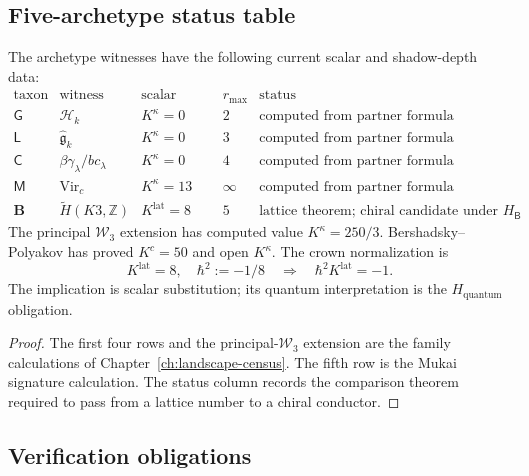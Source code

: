 \subsection{Five-archetype status table}
\label{ssec:climax-unified-five-archetypes}

\begin{proposition}
\label{prop:five-archetype-specialisation}
\ClaimStatusConditional
The archetype witnesses have the following current scalar and
shadow-depth data:
\[
\begin{array}{c|l|c|c|l}
\text{taxon}&\text{witness}&\text{scalar entry}&r_{\max}&\text{status}\\\hline
\mathsf G&\mathcal H_k&K^\kappa=0&2&\text{computed from partner formula}\\
\mathsf L&\widehat{\mathfrak g}_k&K^\kappa=0&3&\text{computed from partner formula}\\
\mathsf C&\beta\gamma_\lambda/bc_\lambda&K^\kappa=0&4&\text{computed from partner formula}\\
\mathsf M&\mathrm{Vir}_c&K^\kappa=13&\infty&\text{computed from partner formula}\\
\mathbf B&\widetilde H(K3,\mathbb Z)&K^{\mathrm{lat}}=8&5&
 \text{lattice theorem; chiral candidate under }H_{\mathsf B}
\end{array}
\]
The principal \(\mathcal W_3\) extension has computed value
\(K^\kappa=250/3\).  Bershadsky--Polyakov has proved \(K^c=50\) and
open \(K^\kappa\).  The crown normalization is
\begin{equation}
\label{eq:unified-crown-identity}
 K^{\mathrm{lat}}=8,\quad \hbar^2:=-1/8
 \quad\Longrightarrow\quad
 \hbar^2K^{\mathrm{lat}}=-1.
\end{equation}
The implication is scalar substitution; its quantum interpretation is
the \(H_{\mathrm{quantum}}\) obligation.
\end{proposition}

\begin{proof}
The first four rows and the principal-\(\mathcal W_3\) extension are
the family calculations of Chapter~\ref{ch:landscape-census}.  The
fifth row is the Mukai signature calculation.  The status column
records the comparison theorem required to pass from a lattice number
to a chiral conductor.
\end{proof}

\subsection{Verification obligations}
\label{ssec:climax-unified-three-verification-paths}

